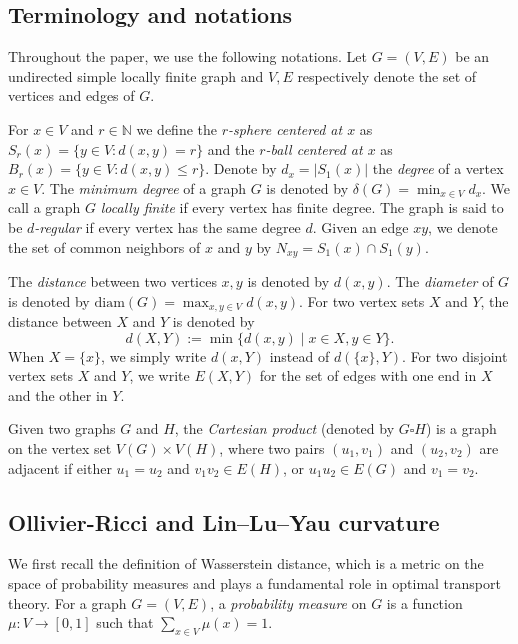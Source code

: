\documentclass[11pt,bezier]{article}
\theoremstyle{definition}
\theoremstyle{definition}
\theoremstyle{nonumber}
\begin{document}
\subsection{Terminology and  notations}
Throughout the paper, we use the following notations. 
Let $G = (V, E)$ be an undirected simple locally finite graph and $V, E$ respectively denote the set of vertices and edges of $G$.

For $x \in V$ and $r \in \mathbb{N}$ we define the \textit{$r$-sphere centered at $x$} as $S_r(x) = \{y \in V : d(x,y) = r\}$ and the \textit{$r$-ball centered at $x$} as $B_r(x) = \{y \in V : d(x,y) \leq r\}$. Denote by $d_x = |S_1(x)|$ the \textit{degree} of a vertex $x \in V$. The \textit{minimum degree} of a graph $G$ is denoted by $\delta(G) = \min_{x \in V} d_x$. We call a graph $G$ \textit{locally finite} if every vertex has finite degree. The graph is said to be \textit{$d$-regular} if every vertex has the same degree $d$.
Given an edge $xy$, we denote the set of common neighbors of $x$ and $y$ by $N_{xy} = S_1(x) \cap S_1(y)$.

The \textit{distance} between two vertices $x, y$ is denoted by $d(x, y)$. 
The \textit{diameter} of $G$ is denoted by $\mathrm{diam}(G) = \max_{x,y \in V} d(x,y)$.
For two vertex sets $X$ and $Y$, the distance between $X$ and $Y$ is denoted by
$$d(X, Y) := \min \{ d(x, y) \mid x \in X, y \in Y \}.$$
When $X = \{x\}$, we simply write $d(x, Y)$ instead of $d(\{x\}, Y)$. 
For two disjoint vertex sets $X$ and $Y$, we write $E(X, Y)$ for the set of edges with one end in $X$ and the other in $Y$.

Given two graphs $G$ and $H$, the \textit{Cartesian product} (denoted by $G \square H$) is a graph on the vertex set $V(G) \times V(H)$, where two pairs $(u_1, v_1)$ and $(u_2, v_2)$ are adjacent if either $u_1 = u_2$ and $v_1v_2 \in E(H)$, or $u_1u_2 \in E(G)$ and $v_1 = v_2$. 

\subsection{Ollivier-Ricci and Lin--Lu--Yau curvature}\label{Lin--Lu--Yau curvature}

We first recall the definition of Wasserstein distance, which is a metric on the space of probability measures and plays a fundamental role in optimal transport theory.
For a graph $G = (V, E)$, a \textit{probability measure} on $G$ is a function $\mu : V \to [0, 1]$ such that $\sum_{x \in V} \mu(x) = 1$.
\end{document}
